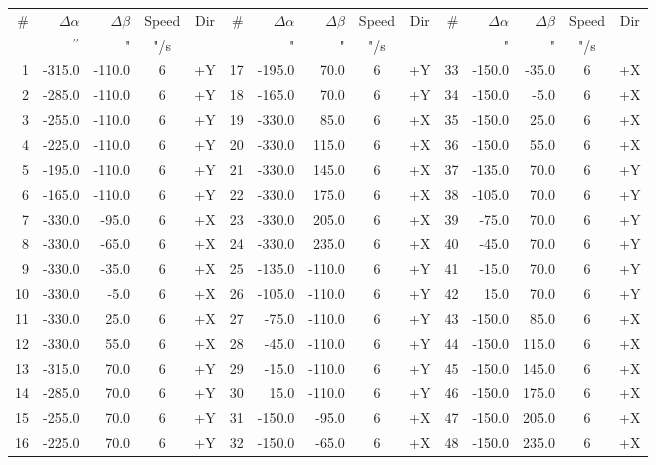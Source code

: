 \documentclass{article}
\begin{document}
\begin{table}
\centering
\setlength{\tabcolsep}{2pt}
\begin{tabular}{rrrcc|rrrcc|rrrcc}
\hline
\hline
\# & $\Delta\alpha$ & $\Delta\beta$ & Speed & Dir &\# & $\Delta\alpha$ & $\Delta\beta$ & Speed & Dir &\# & $\Delta\alpha$ & $\Delta\beta$ & Speed & Dir\\
 &  $^{\prime\prime}$ & " & "/s && & " & " & "/s && & " & " & "/s &\\
\hline
1 & -315.0 & -110.0 & 6 & +Y &17 & -195.0 & 70.0 & 6 & +Y &33 & -150.0 & -35.0 &6 & +X\\
2 & -285.0 & -110.0 & 6 & +Y &18 & -165.0 & 70.0 & 6 & +Y &34 & -150.0 & -5.0 &6 & +X\\
3 & -255.0 & -110.0 & 6 & +Y &19 & -330.0 & 85.0 & 6 & +X &35 & -150.0 & 25.0 &6 & +X\\
4 & -225.0 & -110.0 & 6 & +Y &20 & -330.0 & 115.0 & 6 & +X &36 & -150.0 & 55.0 &6 & +X\\
5 & -195.0 & -110.0 & 6 & +Y &21 & -330.0 & 145.0 & 6 & +X &37 & -135.0 & 70.0 &6 & +Y\\
6 & -165.0 & -110.0 & 6 & +Y &22 & -330.0 & 175.0 & 6 & +X &38 & -105.0 & 70.0 &6 & +Y\\
7 & -330.0 & -95.0 & 6 & +X &23 & -330.0 & 205.0 & 6 & +X &39 & -75.0 & 70.0 &6 & +Y\\
8 & -330.0 & -65.0 & 6 & +X &24 & -330.0 & 235.0 & 6 & +X &40 & -45.0 & 70.0 &6 & +Y\\
9 & -330.0 & -35.0 & 6 & +X &25 & -135.0 & -110.0 & 6 & +Y &41 & -15.0 & 70.0 &6 & +Y\\
10 & -330.0 & -5.0 & 6 & +X &26 & -105.0 & -110.0 & 6 & +Y &42 & 15.0 & 70.0 &6 & +Y\\
11 & -330.0 & 25.0 & 6 & +X &27 & -75.0 & -110.0 & 6 & +Y &43 & -150.0 & 85.0 &6 & +X\\
12 & -330.0 & 55.0 & 6 & +X &28 & -45.0 & -110.0 & 6 & +Y &44 & -150.0 & 115.0 &6 & +X\\
13 & -315.0 & 70.0 & 6 & +Y &29 & -15.0 & -110.0 & 6 & +Y &45 & -150.0 & 145.0 &6 & +X\\
14 & -285.0 & 70.0 & 6 & +Y &30 & 15.0 & -110.0 & 6 & +Y &46 & -150.0 & 175.0 &6 & +X\\
15 & -255.0 & 70.0 & 6 & +Y &31 & -150.0 & -95.0 & 6 & +X &47 & -150.0 & 205.0 &6 & +X\\
16 & -225.0 & 70.0 & 6 & +Y &32 & -150.0 & -65.0 & 6 & +X &48 & -150.0 & 235.0 &6 & +X\\
\hline
\hline
\end{tabular}
\end{table}
\end{document}
